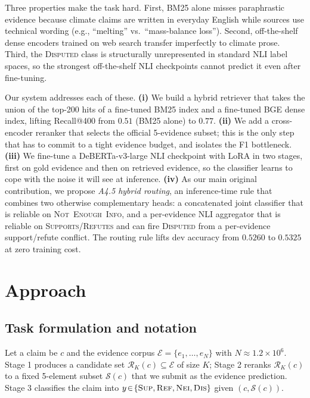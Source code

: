 \documentclass[11pt]{article}
\begin{document}
Three properties make the task hard. First, BM25 alone misses
paraphrastic evidence because climate claims are written in everyday
English while sources use technical wording (e.g., ``melting'' vs.\
``mass-balance loss''). Second, off-the-shelf dense encoders trained
on web search transfer imperfectly to climate prose. Third, the
\textsc{Disputed} class is structurally unrepresented in standard NLI
label spaces, so the strongest off-the-shelf NLI checkpoints cannot
predict it even after fine-tuning.

Our system addresses each of these.
\textbf{(i)} We build a hybrid retriever that takes the union of the
top-200 hits of a fine-tuned BM25 index and a fine-tuned BGE dense
index, lifting Recall@400 from $0.51$ (BM25 alone) to $0.77$.
\textbf{(ii)} We add a cross-encoder reranker that selects the
official 5-evidence subset; this is the only step that has to commit
to a tight evidence budget, and isolates the F1 bottleneck.
\textbf{(iii)} We fine-tune a DeBERTa-v3-large NLI checkpoint with
LoRA in two stages, first on gold evidence and then on retrieved
evidence, so the classifier learns to cope with the noise it will see
at inference.
\textbf{(iv)} As our main original contribution, we propose
\emph{A4.5 hybrid routing}, an inference-time rule that combines two
otherwise complementary heads: a concatenated joint classifier that
is reliable on \textsc{Not~Enough~Info}, and a per-evidence NLI
aggregator that is reliable on \textsc{Supports}/\textsc{Refutes} and
can fire \textsc{Disputed} from a per-evidence support/refute
conflict. The routing rule lifts dev accuracy from $0.5260$ to
$0.5325$ at zero training cost.

\section{Approach}

\subsection{Task formulation and notation}
\label{sec:notation}
Let a claim be $c$ and the evidence corpus
$\mathcal{E}=\{e_1,\dots,e_N\}$ with $N\!\approx\!1.2\!\times\!10^6$.
Stage 1 produces a candidate set
$\mathcal{R}_K(c)\!\subseteq\!\mathcal{E}$ of size $K$; Stage 2
reranks $\mathcal{R}_K(c)$ to a fixed 5-element subset
$\mathcal{S}(c)$ that we submit as the evidence prediction. Stage 3
classifies the claim into
$y\!\in\!\{\textsc{Sup},\textsc{Ref},\textsc{Nei},\textsc{Dis}\}$
given $(c,\mathcal{S}(c))$.
\end{document}
